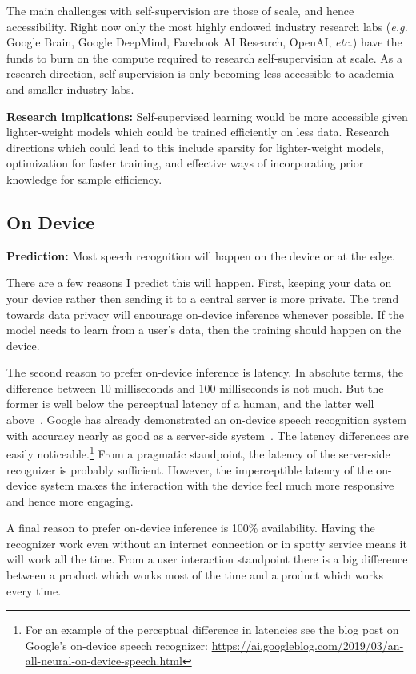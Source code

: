 The main challenges with self-supervision are those of scale, and hence
accessibility. Right now only the most highly endowed industry research labs
(\emph{e.g.} Google Brain, Google DeepMind, Facebook AI Research, OpenAI,
\emph{etc.}) have the funds to burn on the compute required to research
self-supervision at scale. As a research direction, self-supervision is only
becoming less accessible to academia and smaller industry labs.

{\bf Research implications:} Self-supervised learning would be more accessible
given lighter-weight models which could be trained efficiently on less data.
Research directions which could lead to this include sparsity for
lighter-weight models, optimization for faster training, and effective ways of
incorporating prior knowledge for sample efficiency.

\subsection{On Device}
\label{sec:on_device}

{\bf Prediction:} Most speech recognition will happen on the device or at the
edge.

There are a few reasons I predict this will happen. First, keeping your data on
your device rather then sending it to a central server is more private. The
trend towards data privacy will encourage on-device inference whenever
possible. If the model needs to learn from a user's data, then the training
should happen on the device.

The second reason to prefer on-device inference is latency. In absolute terms,
the difference between 10 milliseconds and 100 milliseconds is not much.  But
the former is well below the perceptual latency of a human, and the latter well
above~\citep{lago2004quest, levitin2000perception}.  Google has already
demonstrated an on-device speech recognition system with accuracy nearly as
good as a server-side system~\citep{he2019streaming}. The latency differences
are easily noticeable.\footnote{For an example of the perceptual difference in
latencies see the blog post on Google's on-device speech recognizer:
\url{https://ai.googleblog.com/2019/03/an-all-neural-on-device-speech.html}}
From a pragmatic standpoint, the latency of the server-side recognizer is
probably sufficient. However, the imperceptible latency of the on-device system
makes the interaction with the device feel much more responsive and hence more
engaging.

A final reason to prefer on-device inference is 100\% availability. Having the
recognizer work even without an internet connection or in spotty service means
it will work all the time. From a user interaction standpoint there is a big
difference between a product which works most of the time and a product which
works every time.

